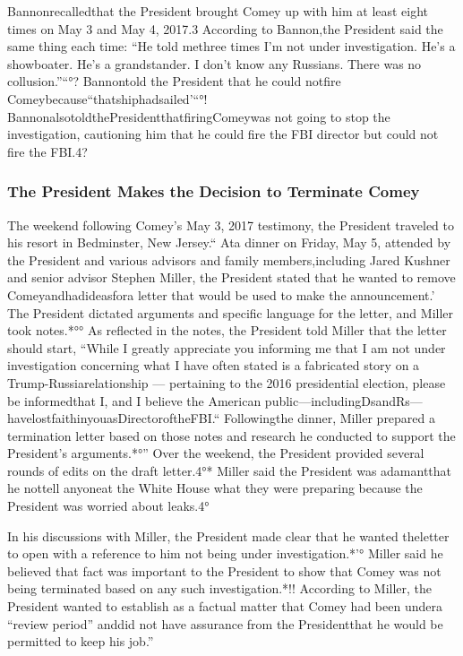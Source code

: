{Bannonrecalledthat the President brought Comey up with him at least eight times on May 3 and May 4, 2017.3
According to Bannon,the President said the same thing each time: “He told methree times I’m not under investigation.
He’s a showboater.
He’s a grandstander.
I don’t know any Russians.
There was no collusion.”“°?
Bannontold the President that he could notfire Comeybecause“thatshiphadsailed’“°!
BannonalsotoldthePresidentthatfiringComeywas not going to stop the investigation, cautioning him that he could fire the FBI director but could not fire the FBI.4?

\subsubsection{The President Makes the Decision to Terminate Comey}

The weekend following Comey’s May 3, 2017 testimony, the President traveled to his resort in Bedminster, New Jersey.“
Ata dinner on Friday, May 5, attended by the President and various advisors and family members,including Jared Kushner and senior advisor Stephen Miller, the President stated that he wanted to remove Comeyandhadideasfora letter that would be used to make the announcement.’
The President dictated arguments and specific language for the letter, and Miller took notes.*°°
As reflected in the notes, the President told Miller that the letter should start, “While I greatly appreciate you informing me that I am not under investigation concerning what I have often stated is a fabricated story on a Trump-Russiarelationship — pertaining to the 2016 presidential election, please be informedthat I, and I believe the American public—includingDsandRs—havelostfaithinyouasDirectoroftheFBI.“
Followingthe dinner, Miller prepared a termination letter based on those notes and research he conducted to support the President’s arguments.*°”
Over the weekend, the President provided several rounds of edits on the draft letter.4°*
Miller said the President was adamantthat he nottell anyoneat the White House what they were preparing because the President was worried about leaks.4°

In his discussions with Miller, the President made clear that he wanted theletter to open with a reference to him not being under investigation.*'°
Miller said he believed that fact was important to the President to show that Comey was not being terminated based on any such investigation.*!!
According to Miller, the President wanted to establish as a factual matter that Comey had been undera “review period” anddid not have assurance from the Presidentthat he would be permitted to keep his job.”

}
